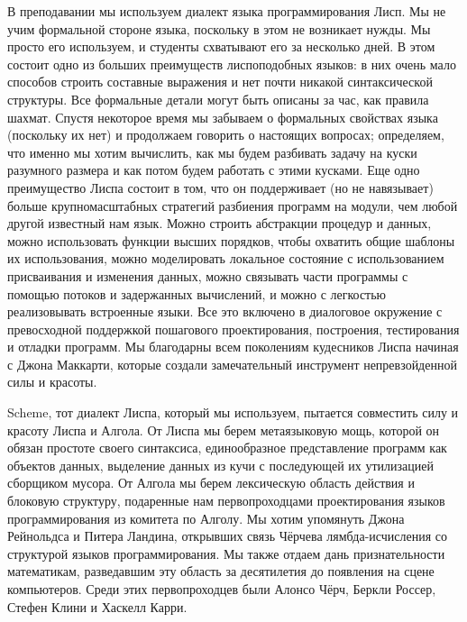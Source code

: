 В преподавании мы используем диалект языка
программирования Лисп.  Мы не учим формальной стороне языка, поскольку 
в этом не возникает нужды.  Мы просто его используем, и студенты
схватывают его за несколько дней.  В этом состоит одно из больших
преимуществ лиспоподобных языков: в них очень мало способов строить
составные выражения и нет почти никакой синтаксической структуры.  Все
формальные детали могут быть описаны за час, как правила шахмат.
Спустя некоторое время мы забываем о формальных свойствах языка
(поскольку их нет) и продолжаем говорить о настоящих вопросах;
определяем, что именно мы хотим вычислить, как мы будем разбивать
задачу на куски разумного размера и как потом будем работать с
этими кусками.  Еще одно преимущество Лиспа состоит в том, что он поддерживает 
(но не навязывает) больше крупномасштабных стратегий разбиения
программ на модули, чем любой другой известный нам язык.  Можно
строить абстракции процедур и данных, можно использовать функции
высших порядков, чтобы охватить общие шаблоны их использования, можно
моделировать локальное состояние с использованием присваивания и
изменения данных, можно связывать части программы с помощью потоков и
задержанных вычислений, и можно с легкостью реализовывать встроенные
языки.  Все это включено в диалоговое окружение с превосходной
поддержкой пошагового проектирования, построения, тестирования и
отладки программ.  Мы благодарны всем поколениям кудесников Лиспа
начиная с Джона Маккарти, которые создали замечательный инструмент
непревзойденной силы и красоты.

Scheme, тот диалект Лиспа, который мы используем, пытается
совместить силу и красоту Лиспа и Алгола.  От Лиспа мы
берем метаязыковую мощь, которой он обязан простоте своего
синтаксиса, единообразное представление программ как объектов данных,
выделение данных из кучи с последующей их утилизацией сборщиком
мусора.  От Алгола 
мы берем лексическую область действия и блоковую структуру, подаренные 
нам первопроходцами проектирования языков программирования из комитета по
Алголу.  Мы хотим упомянуть Джона Рейнольдса и Питера Ландина,
открывших связь Чёрчева лямбда-исчисления со структурой языков
программирования.  Мы также отдаем дань признательности математикам,
разведавшим эту область за десятилетия до появления на сцене
компьютеров.  Среди этих первопроходцев были Алонсо Чёрч, Беркли Россер,
Стефен Клини и Хаскелл Карри. 
